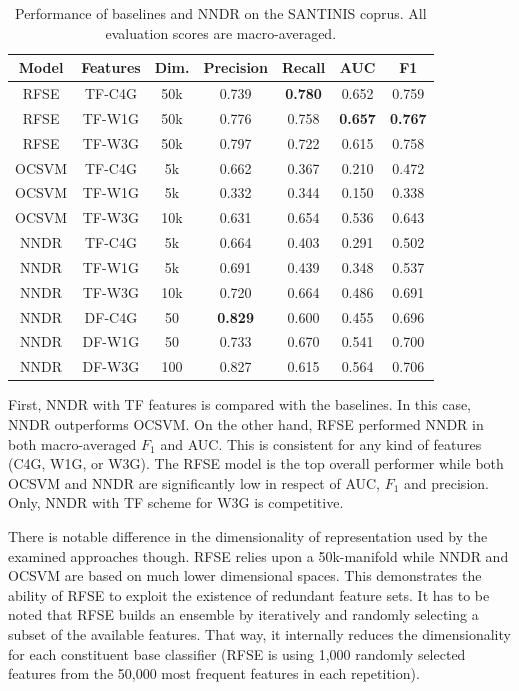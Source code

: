 \begin{table}[t]
\center
\caption {Performance of baselines and NNDR on the SANTINIS coprus. All evaluation scores are macro-averaged.}
\label{chap:word_embeddings:tbl:NNDR_RFSE_OCSVME_final}
\begin{tabular}{ccccccc}
\hline
Model & Features & Dim. & Precision & Recall & AUC & F1 \\
\hline
RFSE & TF-C4G & 50k & 0.739 & \textbf{0.780} & 0.652 & 0.759 \\
RFSE & TF-W1G & 50k & 0.776 & 0.758 & \textbf{0.657} & \textbf{0.767} \\
RFSE & TF-W3G & 50k & 0.797 & 0.722 & 0.615 & 0.758 \\
OCSVM & TF-C4G & 5k & 0.662 & 0.367 & 0.210 & 0.472\\
OCSVM & TF-W1G & 5k & 0.332 & 0.344 & 0.150 & 0.338\\
OCSVM & TF-W3G & 10k & 0.631 & 0.654 & 0.536 & 0.643\\
NNDR & TF-C4G & 5k & 0.664 & 0.403 & 0.291 & 0.502 \\
NNDR & TF-W1G & 5k & 0.691 & 0.439 & 0.348 & 0.537 \\
NNDR & TF-W3G & 10k & 0.720 & 0.664 & 0.486 & 0.691 \\
NNDR & DF-C4G & 50 & \textbf{0.829} & 0.600 & 0.455 & 0.696 \\
NNDR & DF-W1G & 50 & 0.733 & 0.670 & 0.541 & 0.700 \\
NNDR & DF-W3G & 100 & 0.827 & 0.615 & 0.564 & 0.706 \\
\hline
\end{tabular}
\end{table}

First, NNDR with TF features is compared with the baselines. In this case, NNDR outperforms OCSVM. On the other hand, RFSE performed NNDR in both macro-averaged $F_{1}$ and AUC. This is consistent for any kind of features (C4G, W1G, or W3G). The RFSE model is the top overall performer while both OCSVM and NNDR are significantly low in respect of AUC, $F_{1}$ and precision. Only, NNDR with TF scheme for W3G is competitive. 

There is notable difference in the dimensionality of representation used by the examined approaches though. RFSE relies upon a 50k-manifold while NNDR and OCSVM are based on much lower dimensional spaces. This demonstrates the ability of RFSE to exploit the existence of redundant feature sets. It has to be noted that RFSE builds an ensemble by iteratively and randomly selecting a subset of the available features. That way, it internally reduces the dimensionality for each constituent base classifier (RFSE is using 1,000 randomly selected features from the 50,000 most frequent features in each repetition). 

